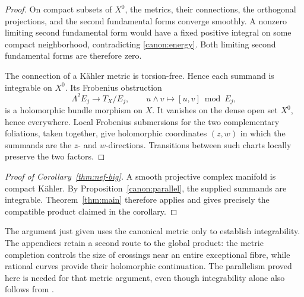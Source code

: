 \begin{proof}
On compact subsets of \(X^0\), the metrics, their connections, the
orthogonal projections, and the second fundamental forms converge
smoothly.  A nonzero limiting second fundamental form would have a
fixed positive integral on some compact neighborhood, contradicting
\eqref{canon:energy}.  Both limiting second fundamental forms are
therefore zero.

The connection of a Kähler metric is torsion-free.  Hence each
summand is integrable on \(X^0\).  Its Frobenius obstruction
\[
 \Lambda^2E_j\longrightarrow T_X/E_j,\qquad
 u\wedge v\longmapsto [u,v]\bmod E_j,
\]
is a holomorphic bundle morphism on \(X\).  It vanishes on the
dense open set \(X^0\), hence everywhere.
Local Frobenius submersions for the two complementary foliations,
taken together, give holomorphic coordinates
\((z,w)\) in which the summands are the \(z\)- and \(w\)-directions.
Transitions between such charts locally preserve the two factors.
\end{proof}


\begin{proof}[Proof of Corollary~\ref{thm:nef-big}]
A smooth projective complex manifold is compact K\"ahler. By
Proposition~\ref{canon:parallel}, the supplied summands are integrable.
Theorem~\ref{thm:main} therefore applies and gives precisely the compatible
product claimed in the corollary.
\end{proof}

The argument just given uses the canonical metric only to establish
integrability. The appendices retain a second route to the global
product: the metric completion controls the size of crossings near an
entire exceptional fibre, while rational curves provide their holomorphic
continuation. The parallelism proved here is needed for that metric
argument, even though integrability alone also follows from
\cite[Theorem~1.3]{Horing07}.
